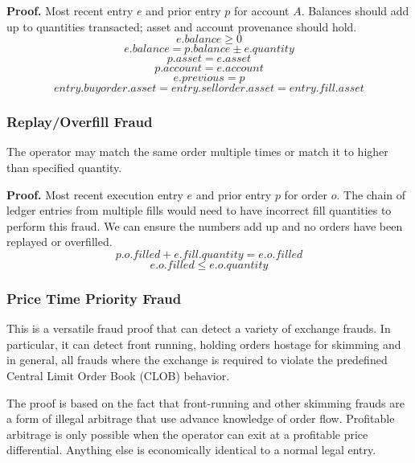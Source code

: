 \documentclass[12pt,a4paper]{article}
\begin{document}
\textbf{Proof.} 
Most recent entry $e$ and prior entry $p$ for account $A$. Balances should add up to quantities transacted; asset and account provenance should hold.
\begin{equation}e.balance \geq 0\end{equation}
\begin{equation}
  e.balance = p.balance \pm e.quantity  
\end{equation}
\begin{equation}p.asset = e.asset\end{equation}
\begin{equation}p.account = e.account\end{equation}
\begin{equation}e.previous = p\end{equation}
\begin{equation}
entry.buyorder.asset = entry.sellorder.asset = entry.fill.asset
\end{equation}
\subsubsection{Replay/Overfill Fraud} \label{fp:rof}
The operator may match the same order multiple times or match it to higher than specified quantity.

\textbf{Proof.} 
Most recent execution entry $e$ and prior entry $p$ for order $o$. The chain of ledger entries from multiple fills would need to have incorrect fill quantities to perform this fraud. We can ensure the numbers add up and no orders have been replayed or overfilled.
\begin{equation}p.o.filled + e.fill.quantity = e.o.filled\end{equation}
\begin{equation}
    e.o.filled \leq e.o.quantity
\end{equation}
\subsubsection{Price Time Priority Fraud}\label{fp:ptp}
This is a versatile fraud proof that can detect a variety of exchange frauds. In particular, it can detect front running, holding orders hostage for skimming and in general, all frauds where the exchange is required to violate the predefined Central Limit Order Book (CLOB) behavior. 

The proof is based on the fact that front-running and other skimming frauds are a form of illegal arbitrage that use advance knowledge of order flow. Profitable arbitrage is only possible when the operator can exit at a profitable price differential. Anything else is economically identical to a normal legal entry.
\end{document}
